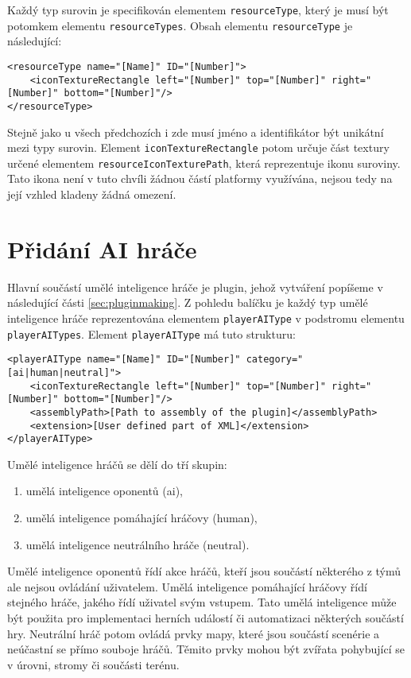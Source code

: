 Každý typ surovin je specifikován elementem \texttt{resourceType}, který je musí být potomkem elementu \texttt{resourceTypes}. Obsah elementu \texttt{resourceType} je následující:
\begin{lstlisting}
<resourceType name="[Name]" ID="[Number]">
	<iconTextureRectangle left="[Number]" top="[Number]" right="[Number]" bottom="[Number]"/>
</resourceType>
\end{lstlisting}

Stejně jako u všech předchozích i zde musí jméno a identifikátor být unikátní mezi typy surovin. Element \texttt{iconTextureRectangle} potom určuje část textury určené elementem \texttt{resourceIconTexturePath}, která reprezentuje ikonu suroviny. Tato ikona není v tuto chvíli žádnou částí platformy využívána, nejsou tedy na její vzhled kladeny žádná omezení.

\section{Přidání AI hráče}
Hlavní součástí umělé inteligence hráče je plugin, jehož vytváření popíšeme v následující části \ref{sec:pluginmaking}. Z pohledu balíčku je každý typ umělé inteligence hráče reprezentována elementem \texttt{playerAIType} v podstromu elementu \texttt{playerAITypes}. Element \texttt{playerAIType} má tuto strukturu:

\begin{lstlisting}
<playerAIType name="[Name]" ID="[Number]" category="[ai|human|neutral]">
	<iconTextureRectangle left="[Number]" top="[Number]" right="[Number]" bottom="[Number]"/>
	<assemblyPath>[Path to assembly of the plugin]</assemblyPath>
	<extension>[User defined part of XML]</extension>
</playerAIType>
\end{lstlisting}

Umělé inteligence hráčů se dělí do tří skupin:
\begin{enumerate}
	\item umělá inteligence oponentů (ai),
	\item umělá inteligence pomáhající hráčovy (human),
	\item umělá inteligence neutrálního hráče (neutral).
\end{enumerate}

Umělé inteligence oponentů řídí akce hráčů, kteří jsou součástí některého z týmů ale nejsou ovládání uživatelem. Umělá inteligence pomáhající hráčovy řídí stejného hráče, jakého řídí uživatel svým vstupem. Tato umělá inteligence může být použita pro implementaci herních událostí či automatizaci některých součástí hry. Neutrální hráč potom ovládá prvky mapy, které jsou součástí scenérie a neúčastní se přímo souboje hráčů. Těmito prvky mohou být zvířata pohybující se v úrovni, stromy či součásti terénu. 

